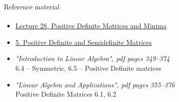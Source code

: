\documentclass[aspectratio=169]{beamer}
\newcommand{\fbckg}[1]{\usebackgroundtemplate{\texttt{[image: \#1]}}}%
\begin{document}


\begin{frame}[t]{Reference material}
    \framesubtitle{}
    \Large
    \begin{itemize}
        \item \href{https://www.youtube.com/watch?v=vF7eyJ2g3kU&list=PL49CF3715CB9EF31D&index=28}{Lecture 28, Positive Definite Matrices and Minima}
        \item \href{https://www.youtube.com/watch?v=xsP-S7yKaRA&list=PLUl4u3cNGP63oMNUHXqIUcrkS2PivhN3k&index=7}{5. Positive Definite and Semidefinite Matrices}
        \item \textit{"Introduction to Linear Algebra", pdf pages 349--374 }\\  6.4 -- Symmetric, 6.5 -- Positive Definite matrices
        \item \textit{"Linear Algebra and Applications", pdf pages 355--376 }\\ Positive Definite Matrices 6.1, 6.2
    \end{itemize}
\end{frame}

\fbckg{fibeamer/figs/last_page.png}
\frame[plain]{}
\end{document}
